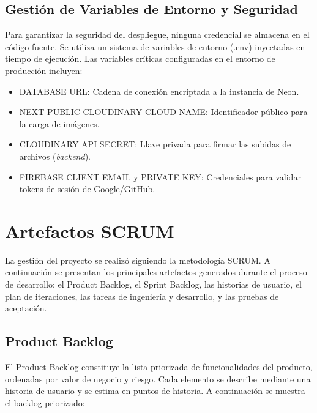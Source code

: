 \subsection{Gestión de Variables de Entorno y Seguridad}

Para garantizar la seguridad del despliegue, ninguna credencial se almacena en el código fuente. Se utiliza un sistema de variables de entorno (.env) inyectadas en tiempo de ejecución. Las variables críticas configuradas en el entorno de producción incluyen:

\begin{itemize}
    \item DATABASE URL: Cadena de conexión encriptada a la instancia de Neon.
    \item NEXT PUBLIC CLOUDINARY CLOUD NAME: Identificador público para la carga de imágenes.
    \item CLOUDINARY API SECRET: Llave privada para firmar las subidas de archivos (\textit{backend}).
    \item FIREBASE CLIENT EMAIL y PRIVATE KEY: Credenciales para validar tokens de sesión de Google/GitHub.
\end{itemize}

\section{Artefactos SCRUM}
\label{sec:scrum}

La gestión del proyecto se realizó siguiendo la metodología SCRUM. A continuación se presentan los principales artefactos generados durante el proceso de desarrollo: el Product Backlog, el Sprint Backlog, las historias de usuario, el plan de iteraciones, las tareas de ingeniería y desarrollo, y las pruebas de aceptación.

\subsection{Product Backlog}

El Product Backlog constituye la lista priorizada de funcionalidades del producto, ordenadas por valor de negocio y riesgo. Cada elemento se describe mediante una historia de usuario y se estima en puntos de historia. A continuación se muestra el backlog priorizado:


